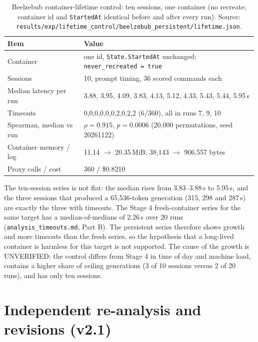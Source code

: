 \documentclass[a4paper,11pt]{article}
\begin{document}
\begin{table}[ht]
\centering
\caption{Beelzebub container-lifetime control: ten sessions, one container
(no recreate; container id and \texttt{StartedAt} identical before and after
every run). Source:
\texttt{results/exp/lifetime\_control/beelzebub\_persistent/lifetime.json}.}
\label{tab:lifetime}
\scriptsize
\begin{tabular}{@{}l p{11.2cm}@{}}
\toprule
Item & Value \\
\midrule
Container & one id, \texttt{State.StartedAt} unchanged; \texttt{never\_recreated = true} \\
Sessions & 10, prompt timing, 36 scored commands each \\
Median latency per run & 3.88, 3.95, 4.09, 3.83, 4.13, 5.12, 4.33, 5.43, 5.44, 5.95\,s \\
Timeouts & 0,0,0,0,0,0,2,0,2,2 (6/360), all in runs 7, 9, 10 \\
Spearman, median vs run & $\rho = 0.915$, $p = 0.0006$ (20,000 permutations, seed 20261122) \\
Container memory / log & 11.14 $\rightarrow$ 20.35\,MiB; 38,143 $\rightarrow$ 906,557 bytes \\
Proxy calls / cost & 360 / \$0.8210 \\
\bottomrule
\end{tabular}
\end{table}

The ten-session series is not flat: the median rises from 3.83--3.88\,s to
5.95\,s, and the three sessions that produced a 65,536-token generation (315,
298 and 287\,s) are exactly the three with timeouts. The Stage 4 fresh-container
series for the same target has a median-of-medians of 2.26\,s over 20 runs
(\texttt{analysis\_timeouts.md}, Part B). The persistent series therefore shows
growth and more timeouts than the fresh series, so the hypothesis that a
long-lived container is harmless for this target is not supported. The cause of
the growth is UNVERIFIED: the control differs from Stage 4 in time of day and
machine load, contains a higher share of ceiling generations (3 of 10 sessions
versus 2 of 20 runs), and has only ten sessions.


\section{Independent re-analysis and revisions (v2.1)}
\label{sec:v21}
\end{document}
